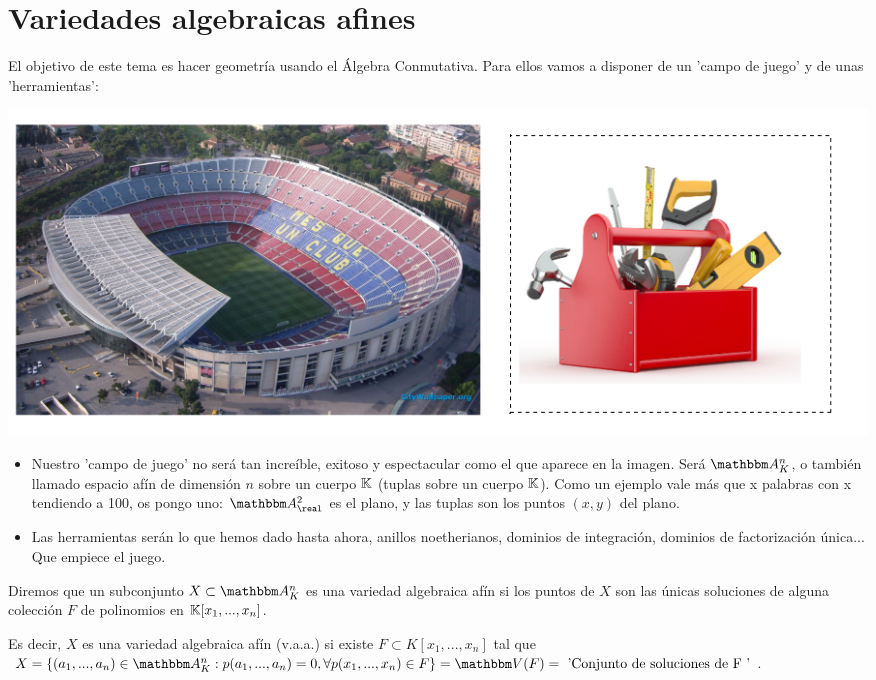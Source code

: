 \chapter{Variedades algebraicas afines}
El objetivo de este tema es hacer geometría usando el Álgebra Conmutativa. Para ellos vamos a disponer de un 'campo de juego' y de unas 'herramientas':

\begin{center}
	\includegraphics[scale=0.45]{img/vaa.png}
\end{center}

\begin{itemize}
	\item Nuestro 'campo de juego' no será tan increíble, exitoso y espectacular como el que aparece en la imagen. Será $\A^n_K$, o también llamado espacio afín de dimensión $n$ sobre un cuerpo $\mathbb{K}$ (tuplas sobre un cuerpo $\mathbb{K}$). Como un ejemplo vale más que x palabras con x tendiendo a 100, os pongo uno: $\A^2_{\real}$ es el plano, y las tuplas son los puntos $(x,y)$ del plano.
	\item Las herramientas serán lo que hemos dado hasta ahora, anillos noetherianos, dominios de integración, dominios de factorización única... Que empiece el juego.
\end{itemize}

\begin{defn}\label{def:variedad_algebraica}
	Diremos que un subconjunto $X\subset \A^n_K$ es una variedad algebraica afín si los puntos de $X$ son las únicas soluciones de alguna colección $F$ de polinomios en $\mathbb{K}[x_1,...,x_n]$. 
	
	Es decir, $X$ es una variedad algebraica afín (v.a.a.) si existe $F \subset K[x_1,...,x_n]$ tal que $X=\{ (a_1,...,a_n) \in \A_K^n: p(a_1,...,a_n)=0,  \forall p(x_1,...,x_n) \in F \} = \V(F)=\text{ 'Conjunto de soluciones de F '}$. 
\end{defn}

